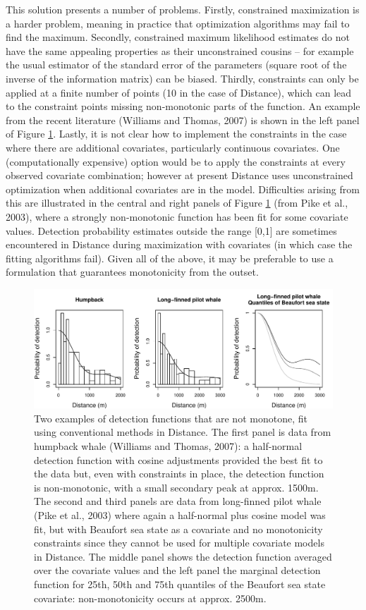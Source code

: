 \documentclass[useAMS,referee]{biom}
\begin{document}
This solution presents a number of problems. Firstly, constrained maximization is a harder problem, meaning in practice that optimization algorithms may fail to find the maximum.  Secondly, constrained maximum likelihood estimates do not have the same appealing properties as their unconstrained cousins -- for example the usual estimator of the standard error of the parameters (square root of the inverse of the information matrix) can be biased.  Thirdly, constraints can only be applied at a finite number of points (10 in the case of Distance), which can lead to the constraint points missing non-monotonic parts of the function.  An example from the recent literature (Williams and Thomas, 2007) is shown in the left panel of Figure \ref{fig1}.  Lastly, it is not clear how to implement the constraints in the case where there are additional covariates, particularly continuous covariates.  One (computationally expensive) option would be to apply the constraints at every observed covariate combination; however at present Distance uses unconstrained optimization when additional covariates are in the model.  Difficulties arising from this are illustrated in the central and right panels of Figure \ref{fig1} (from Pike et al., 2003), where a strongly non-monotonic function has been fit for some covariate values.  Detection probability estimates outside the range [0,1] are sometimes encountered in Distance during maximization with covariates (in which case the fitting algorithms fail).  Given all of the above, it may be preferable to use a formulation that guarantees monotonicity from the outset.

\begin{figure}
\centering
\includegraphics[width=\textwidth]{figs/figure1.pdf}
\caption{Two examples of detection functions that are not monotone, fit using conventional methods in Distance. The first panel is data from humpback whale (Williams and Thomas, 2007): a half-normal detection function with cosine adjustments provided the best fit to the data but, even with constraints in place, the detection function is non-monotonic, with a small secondary peak at approx. 1500m. The second and third panels are data from long-finned pilot whale (Pike et al., 2003) where again a half-normal plus cosine model was fit, but with Beaufort sea state as a covariate and no monotonicity constraints since they cannot be used for multiple covariate models in Distance.  The middle panel shows the detection function averaged over the covariate values and the left panel the marginal detection function for 25th, 50th and 75th quantiles of the Beaufort sea state covariate: non-monotonicity occurs at approx. 2500m.}
\label{fig1}
\end{figure}
\end{document}
